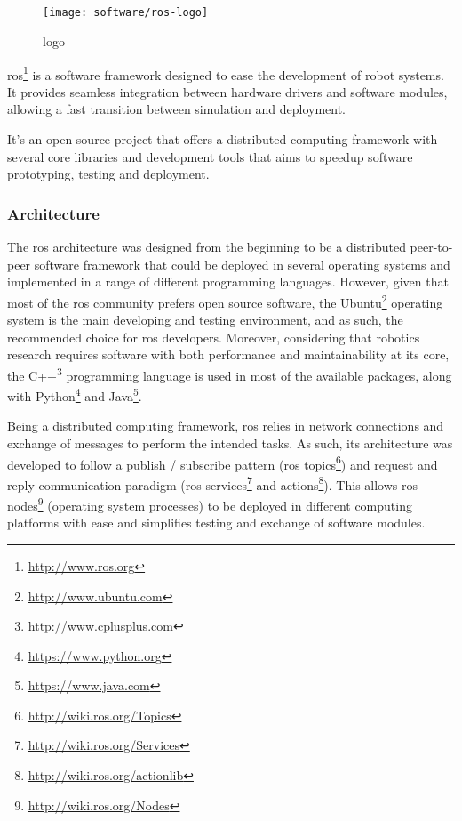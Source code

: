 \subsection{}

\begin{wrapfigure}{r}{0.23\textwidth}
	\centering
	\vspace*{-2em}
	\texttt{[image: software/ros-logo]}
	\caption{ logo}
	\label{fig:ros-logo}
\end{wrapfigure}

\gls{ros}\footnote{\url{http://www.ros.org}} \cite{Quigley2009} is a software framework designed to ease the development of robot systems. It provides seamless integration between hardware drivers and software modules, allowing a fast transition between simulation and deployment.

It's an open source project that offers a distributed computing framework with several core libraries and development tools that aims to speedup software prototyping, testing and deployment.


\subsubsection{Architecture}

The \gls{ros} architecture was designed from the beginning to be a distributed peer-to-peer software framework that could be deployed in several operating systems and implemented in a range of different programming languages. However, given that most of the \gls{ros} community prefers open source software, the Ubuntu\footnote{\url{http://www.ubuntu.com}} operating system is the main developing and testing environment, and as such, the recommended choice for \gls{ros} developers. Moreover, considering that robotics research requires software with both performance and maintainability at its core, the C++\footnote{\url{http://www.cplusplus.com}} programming language is used in most of the available packages, along with Python\footnote{\url{https://www.python.org}} and Java\footnote{\url{https://www.java.com}}.

Being a distributed computing framework, \gls{ros} relies in network connections and exchange of messages to perform the intended tasks. As such, its architecture was developed to follow a publish / subscribe pattern (\gls{ros} topics\footnote{\url{http://wiki.ros.org/Topics}}) and request and reply communication paradigm (\gls{ros} services\footnote{\url{http://wiki.ros.org/Services}} and actions\footnote{\url{http://wiki.ros.org/actionlib}}). This allows \gls{ros} nodes\footnote{\url{http://wiki.ros.org/Nodes}} (operating system processes) to be deployed in different computing platforms with ease and simplifies testing and exchange of software modules.

